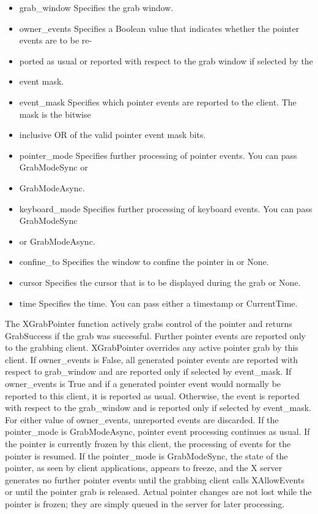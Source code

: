 \documentclass{report}
\begin{document}
\begin{itemize}
\begin{itemize}
                \item grab\_window Specifies the grab window.
                \item owner\_events Specifies a Boolean value that indicates whether the pointer events are to be re-
                \item ported as usual or reported with respect to the grab window if selected by the
                \item event mask.
                \item event\_mask Specifies which pointer events are reported to the client. The mask is the bitwise
                \item inclusive OR of the valid pointer event mask bits.
                \item pointer\_mode Specifies further processing of pointer events. You can pass GrabModeSync or
                \item GrabModeAsync.
                \item keyboard\_mode Specifies further processing of keyboard events. You can pass GrabModeSync
                \item or GrabModeAsync.
                \item confine\_to Specifies the window to confine the pointer in or None.
                \item cursor Specifies the cursor that is to be displayed during the grab or None.
                \item time Specifies the time. You can pass either a timestamp or CurrentTime.
            \end{itemize}
            The XGrabPointer function actively grabs control of the pointer and returns GrabSuccess if the grab was successful. Further pointer events are reported only to the grabbing client. XGrabPointer overrides any active pointer grab by this client. If owner\_events is False, all generated pointer events are reported with respect to grab\_window and are reported only if selected by event\_mask. If owner\_events is True and if a generated pointer event would normally be reported to this client, it is reported as usual. Otherwise, the event is reported with respect to the grab\_window and is reported only if selected by event\_mask. For either value of owner\_events, unreported events are discarded.
            \bigbreak \noindent 
            If the pointer\_mode is GrabModeAsync, pointer event processing continues as usual. If the pointer is currently frozen by this client, the processing of events for the pointer is resumed. If the pointer\_mode is GrabModeSync, the state of the pointer, as seen by client applications, appears to freeze, and the X server generates no further pointer events until the grabbing client calls XAllowEvents or until the pointer grab is released. Actual pointer changes are not lost while the pointer is frozen; they are simply queued in the server for later processing.

\end{itemize}
\end{document}
